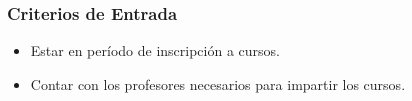 \subsubsection{Criterios de Entrada}			%
	\begin{itemize}
		\item Estar en período de inscripci\'on a cursos.
		\item Contar con los profesores necesarios para impartir los cursos.
		
	\end{itemize}